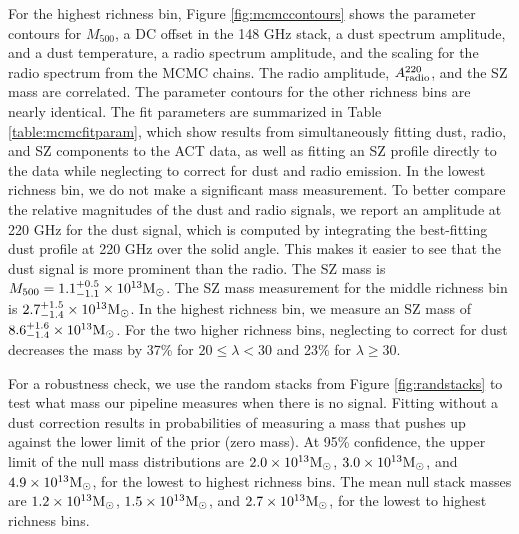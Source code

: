 \documentclass[a4paper,fleqn,usenatbib]{mnras}
\begin{document}
For the highest richness bin, Figure \ref{fig:mcmccontours} shows the parameter contours for $M_{500}$, a DC offset in the 148 GHz stack, a dust spectrum amplitude, and a dust temperature, a radio spectrum amplitude, and the scaling for the radio spectrum from the MCMC chains. 
The radio amplitude, $A^{220}_{\rm radio}$, and the SZ mass are correlated. 
The parameter contours for the other richness bins are nearly identical.
The fit parameters are summarized in Table \ref{table:mcmcfitparam}, which show results from simultaneously fitting dust, radio, and SZ components to the ACT data, as well as fitting an SZ profile directly to the data while neglecting to correct for dust and radio emission. 
In the lowest richness bin, we do not make a significant mass measurement.
To better compare the relative magnitudes of the dust and radio signals, we report an amplitude at 220 GHz for the dust signal, which is computed by integrating the best-fitting dust profile at 220 GHz over the solid angle.
This makes it easier to see that the dust signal is more prominent than the radio.
The SZ mass is $M_{500} = 1.1^{+0.5}_{-1.1} \times 10^{13} \rm M_{\odot}$. 
The SZ mass measurement for the middle richness bin is $2.7^{+1.5}_{-1.4} \times 10^{13} \rm M_{\odot}$. 
In the highest richness bin, we measure an SZ mass of $8.6^{+1.6}_{-1.4} \times 10^{13} \rm M_{\odot}$. 
For the two higher richness bins, neglecting to correct for dust decreases the mass by 37\% for $20 \leq \lambda < 30$ and 23\% for $\lambda \geq 30$.

For a robustness check, we use the random stacks from Figure \ref{fig:randstacks} to test what mass our pipeline measures when there is no signal. 
Fitting without a dust correction results in probabilities of measuring a mass that pushes up against the lower limit of the prior (zero mass). 
At 95\% confidence, the upper limit of the null mass distributions are $2.0 \times 10^{13} \rm M_{\odot}$, $3.0 \times 10^{13} \rm M_{\odot}$, and $4.9 \times 10^{13} \rm M_{\odot}$, for the lowest to highest richness bins.
{The mean null stack masses are $1.2 \times 10^{13} \rm M_{\odot}$, $1.5 \times 10^{13} \rm M_{\odot}$, and $2.7 \times 10^{13} \rm M_{\odot}$, for the lowest to highest richness bins.}
\end{document}
